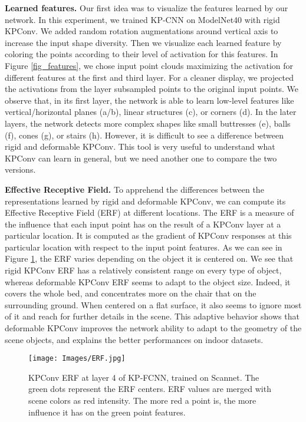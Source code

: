\documentclass[10pt,twocolumn,letterpaper]{article}
\begin{document}
\noindent
\textbf{Learned features.} Our first idea was to visualize the features learned by our network. In this experiment, we trained KP-CNN on ModelNet40 with rigid KPConv. We added random rotation augmentations around vertical axis to increase the input shape diversity. Then we visualize each learned feature by coloring the points according to their level of activation for this features. In Figure \ref{fig_features}, we chose input point clouds maximizing the activation for different features at the first and third layer. For a cleaner display, we projected the activations from the layer subsampled points to the original input points. We observe that, in its first layer, the network is able to learn low-level features like vertical/horizontal planes (a/b), linear structures (c), or corners (d). In the later layers, the network detects more complex shapes like small buttresses (e), balls (f), cones (g), or stairs (h). However, it is difficult to see a difference between rigid and deformable KPConv. This tool is very useful to understand what KPConv can learn in general, but we need another one to compare the two versions.

\noindent
\textbf{Effective Receptive Field.} To apprehend the differences between the representations learned by rigid and deformable KPConv, we can compute its Effective Receptive Field (ERF) \cite{luo2016understanding} at different locations. The ERF is a measure of the influence that each input point has on the result of a KPConv layer at a particular location. It is computed as the gradient of KPConv responses at this particular location with respect to the input point features. As we can see in Figure \ref{fig_ERF}, the ERF varies depending on the object it is centered on. We see that rigid KPConv ERF has a relatively consistent range on every type of object, whereas deformable KPConv ERF seems to adapt to the object size. Indeed, it covers the whole bed, and concentrates more on the chair that on the surrounding ground. When centered on a flat surface, it also seems to ignore most of it and reach for further details in the scene. This adaptive behavior shows that deformable KPConv improves the network ability to adapt to the geometry of the scene objects, and explains the better performances on indoor datasets.


\begin{figure}[t!]
    \centering
    \texttt{[image: Images/ERF.jpg]}
    \caption{KPConv ERF at layer 4 of KP-FCNN, trained on Scannet. The green dots represent the ERF centers. ERF values are merged with scene colors as red intensity. The more red a point is, the more influence it has on the green point features.}
    \label{fig_ERF}
    \vspace{-3ex}
\end{figure}
\end{document}
